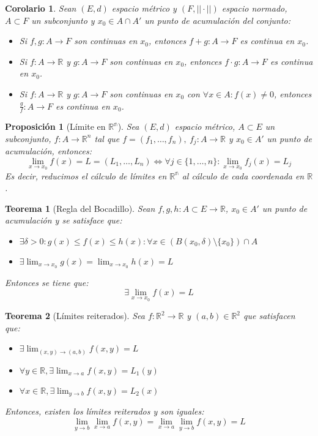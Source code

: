 \documentclass[10pt,a4paper,openright]{book}
\theoremstyle{break}
\newtheorem*{theo}{Teorema}
\newtheorem*{coro}{Corolario}
\newtheorem*{prop}{Proposición}
\begin{document}
\begin{coro}
Sean $(E,d)$ espacio métrico y $(F, || \cdot ||)$ espacio normado, $A \subset F$ un subconjunto y $x_0 \in A \cap A'$ un punto de acumulación del conjunto:
\begin{itemize}
\item Si $f, g : A \to F$ son continuas en $x_0$, entonces $f + g: A \to F$ es continua en $x_0$.
\item Si $f: A \to \mathbb{R}$ y $g : A \to F$ son continuas en $x_0$, entonces $f \cdot g: A \to F$ es continua en $x_0$.
\item  Si $f: A \to \mathbb{R}$ y $g : A \to F$ son continuas en $x_0$ con $\forall x \in A: f(x) \neq 0$, entonces $\displaystyle \frac{g}{f}: A \to F$ es continua en $x_0$.
\end{itemize}
\end{coro}

\begin{prop}[Límite en $\mathbb{R^{n}}$]
Sea $(E,d)$ espacio métrico, $A \subset E$ un subconjunto, $f : A \to \mathbb{R}^n$ tal que $f = (f_1, \ldots , f_n),\ f_j : A \to \mathbb{R}$ y $x_0 \in A'$ un punto de acumulación, entonces:
$$\lim_{x \to x_0} f(x) = L = (L_1, \ldots, L_n)\Leftrightarrow \forall j \in \{ 1, \ldots, n\} : \lim_{x \to x_0} f_j (x)= L_j$$
Es decir, reducimos el cálculo de límites en $\mathbb{R^n}$ al cálculo de cada coordenada en $\mathbb{R}$.
\end{prop}

\begin{theo}[Regla del Bocadillo]
Sean $f,g,h : A \subset E \longrightarrow \mathbb{R}$, $x_0 \in A'$ un punto de acumulación y se satisface que:
\begin{itemize}
\item $\exists \delta > 0 : g(x) \leq f(x) \leq h(x) : \forall x \in \left( B(x_0, \delta) \setminus \{x_0\} \right) \cap A$
\item $\exists \lim_{x \to x_0} g(x) = \lim_{x \to x_0} h(x) = L$
\end{itemize}
Entonces se tiene que:
$$\exists \lim_{x \to x_0} f(x) = L$$
\end{theo}

\begin{theo}[Límites reiterados]
Sea $f: \mathbb{R}^2 \longrightarrow \mathbb{R}$ y $(a,b) \in \mathbb{R}^2$ que satisfacen que:
\begin{itemize}
\item $\exists \lim_{(x,y) \to (a,b)} f(x,y) = L$
\item $\forall y \in \mathbb{R}, \exists \lim_{x \to a} f(x,y) = L_1 (y)$
\item $\forall x \in \mathbb{R}, \exists \lim_{y \to b} f(x,y) = L_2 (x)$
\end{itemize}
Entonces, existen los límites reiterados y son iguales:
$$ \lim_{y \to b} \lim_{x \to a} f(x,y) =   \lim_{x \to a} \lim_{y \to b} f(x,y) = L$$
\end{theo}
\end{document}
